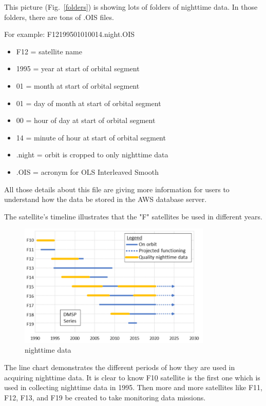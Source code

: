 \documentclass[conference]{IEEEtran}
\begin{document}
This picture (Fig.~\ref{folders}) is showing lots of folders of nighttime data.  In those folders, there are tons of .OIS files. 

For example: F12199501010014.night.OIS

\begin{itemize}
    \item F12 = satellite name
    \item 1995 = year at start of orbital segment 
    \item 01 = month at start of orbital segment 
    \item 01 = day of month at start of orbital segment 
    \item 00 = hour of day at start of orbital segment
    \item 14 = minute of hour at start of orbital segment 
    \item .night = orbit is cropped to only nighttime data 
    \item .OIS = acronym for OLS Interleaved Smooth
\end{itemize}


All those details about this file are giving more information for users to understand how the data be stored in the AWS database server. 

The satellite's timeline illustrates that the "F" satellites be used in different years.

\begin{figure}[htbp]
\centerline{\includegraphics[width=260pt]{images/2.1.png}}
\caption{nighttime data}
\label{nighttimedata}
\end{figure}

The line chart demonstrates the different periods of how they are used in acquiring nighttime data.  It is clear to know F10 satellite 
is the first one which is used in collecting nighttime data in 1995. Then more and more satellites like F11, F12, F13, and F19 be created 
to take monitoring data missions.
\end{document}
